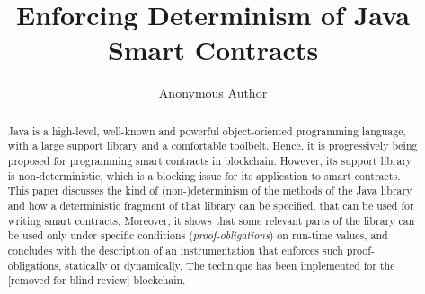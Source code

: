 \documentclass[orivec]{llncs}
\begin{document}
%
\begin{frontmatter}
  \title{Enforcing Determinism of Java Smart Contracts}
  \author{Anonymous Author}
%
\maketitle
%
\begin{abstract}
  Java is a high-level, well-known and powerful object-oriented programming
  language, with a large support library and a comfortable toolbelt.
  Hence, it is progressively being proposed for programming smart contracts
  in blockchain. However, its support library is non-deterministic,
  which is a blocking issue for its application to smart contracts.
  This paper discusses the kind of (non-)determinism of the methods
  of the Java library and how a deterministic fragment of that library can be specified,
  that can be used for writing smart contracts. Moreover, it
  shows that some relevant parts of the library can be used only under specific
  conditions (\emph{proof-obligations}) on run-time values,
  and concludes with the description of
  an instrumentation that enforces such proof-obligations, statically or dynamically.
  The technique has been implemented for the [removed for blind review] blockchain.
\end{abstract}
%
\end{frontmatter}









\end{document}
